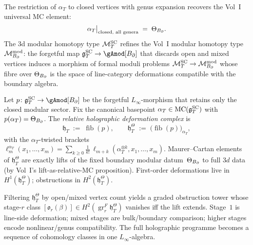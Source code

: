 \begin{corollary}
The restriction of $\alpha_T$ to closed vertices with
genus expansion recovers the Vol~I universal MC element:
\[
\alpha_T\big|_{\text{closed, all genera}}
\;=\;
\Theta_{B_{\partial}}.
\]
The 3d modular homotopy type $\mathcal M^{\mathrm{SC}}_T$ refines the
Vol~I modular homotopy type $\mathcal M^{\mathrm{mod}}_{B_{\partial}}$:
the forgetful map $\gSC_T \to \gAmod[\Bbound]$ that discards
open and mixed vertices induces a morphism of formal moduli
problems $\mathcal M^{\mathrm{SC}}_T \to \mathcal M^{\mathrm{mod}}_{B_{\partial}}$
whose fibre over $\Theta_{B_{\partial}}$ is the space of line-category
deformations compatible with the boundary algebra.
\end{corollary}

\begin{definition}%
%
%
Let $p\colon \gSC_T \to \gAmod[\Bbound]$ be the
forgetful $L_\infty$-morphism that retains only the closed
modular sector. Fix the canonical basepoint
$\alpha_T \in \operatorname{MC}(\mathfrak{g}^{\mathrm{SC}}_T)$ with
$p(\alpha_T) = \Theta_{B_{\partial}}$. The \emph{relative
holographic deformation complex} is
\[
\mathfrak{h}_T
\;:=\;
\operatorname{fib}(p),
\qquad
\mathfrak{h}_T^\Theta
\;:=\;
\bigl(\operatorname{fib}(p)\bigr)_{\alpha_T},
\]
with the $\alpha_T$-twisted brackets
$\ell_m^{\alpha_T}(x_1,\ldots,x_m)
= \sum_{k \geq 0}\frac{1}{k!}\,
\ell_{m+k}(\alpha_T^{\otimes k},x_1,\ldots,x_m)$.
Maurer--Cartan elements of $\mathfrak{h}_T^\Theta$
are exactly lifts of the fixed boundary modular
datum~$\Theta_{B_{\partial}}$ to full $3d$ data
(by Vol~I's lift-as-relative-MC proposition).
First-order deformations live in
$H^1(\mathfrak{h}_T^\Theta)$; obstructions in
$H^2(\mathfrak{h}_T^\Theta)$.
\end{definition}

\begin{remark}%
%
Filtering $\mathfrak{h}_T^\Theta$ by open/mixed vertex
count yields a graded obstruction tower whose stage-$r$
class $[\mathfrak{o}_r(\beta)]
\in H^2(\operatorname{gr}^F_r \mathfrak{h}_T^\Theta)$
vanishes iff the lift extends. Stage~$1$ is line-side
deformation; mixed stages are bulk/boundary comparison;
higher stages encode nonlinear/genus compatibility.
The full holographic programme becomes a sequence of
cohomology classes in one
$L_\infty$-algebra.
\end{remark}

